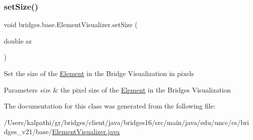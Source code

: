 \subsubsection{\texorpdfstring{set\+Size()}{setSize()}}
{\footnotesize\ttfamily void bridges.\+base.\+Element\+Visualizer.\+set\+Size (\begin{DoxyParamCaption}\item[{double}]{sz }\end{DoxyParamCaption})}

Set the size of the \hyperlink{classbridges_1_1base_1_1_element}{Element} in the Bridge Visualization in pixels


\begin{DoxyParams}{Parameters}
{\em size} & the pixel size of the \hyperlink{classbridges_1_1base_1_1_element}{Element} in the Bridges Visualization \\
\hline
\end{DoxyParams}


The documentation for this class was generated from the following file\+:\begin{DoxyCompactItemize}
\item 
/\+Users/kalpathi/gr/bridges/client/java/bridges16/src/main/java/edu/uncc/cs/bridges\+\_\+v21/base/\hyperlink{_element_visualizer_8java}{Element\+Visualizer.\+java}\end{DoxyCompactItemize}
